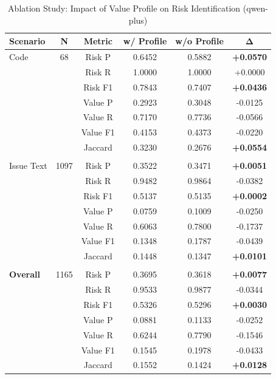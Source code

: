 \begin{table}[htbp]
\centering
\caption{Ablation Study: Impact of Value Profile on Risk Identification (qwen-plus)}
\label{tab:exp3_ablation}
\begin{tabular}{lccccc}
\toprule
\textbf{Scenario} & \textbf{N} & \textbf{Metric} & \textbf{w/ Profile} & \textbf{w/o Profile} & \textbf{Δ} \\
\midrule
Code & 68 & Risk P & 0.6452 & 0.5882 & \textbf{+0.0570} \\
 &  & Risk R & 1.0000 & 1.0000 & +0.0000 \\
 &  & Risk F1 & 0.7843 & 0.7407 & \textbf{+0.0436} \\
 &  & Value P & 0.2923 & 0.3048 & -0.0125 \\
 &  & Value R & 0.7170 & 0.7736 & -0.0566 \\
 &  & Value F1 & 0.4153 & 0.4373 & -0.0220 \\
 &  & Jaccard & 0.3230 & 0.2676 & \textbf{+0.0554} \\
\midrule & \midrule & \midrule & \midrule & \midrule & \midrule \\
Issue Text & 1097 & Risk P & 0.3522 & 0.3471 & \textbf{+0.0051} \\
 &  & Risk R & 0.9482 & 0.9864 & -0.0382 \\
 &  & Risk F1 & 0.5137 & 0.5135 & \textbf{+0.0002} \\
 &  & Value P & 0.0759 & 0.1009 & -0.0250 \\
 &  & Value R & 0.6063 & 0.7800 & -0.1737 \\
 &  & Value F1 & 0.1348 & 0.1787 & -0.0439 \\
 &  & Jaccard & 0.1448 & 0.1347 & \textbf{+0.0101} \\
\midrule & \midrule & \midrule & \midrule & \midrule & \midrule \\
\textbf{Overall} & 1165 & Risk P & 0.3695 & 0.3618 & \textbf{+0.0077} \\
 &  & Risk R & 0.9533 & 0.9877 & -0.0344 \\
 &  & Risk F1 & 0.5326 & 0.5296 & \textbf{+0.0030} \\
 &  & Value P & 0.0881 & 0.1133 & -0.0252 \\
 &  & Value R & 0.6244 & 0.7790 & -0.1546 \\
 &  & Value F1 & 0.1545 & 0.1978 & -0.0433 \\
 &  & Jaccard & 0.1552 & 0.1424 & \textbf{+0.0128} \\
\bottomrule
\end{tabular}
\end{table}